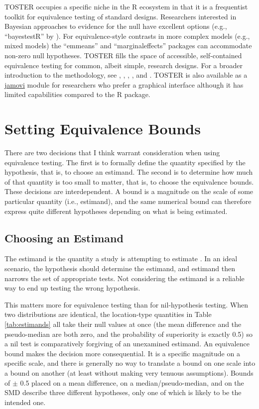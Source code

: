 \documentclass[]{interact}
\theoremstyle{plain}%
\theoremstyle{definition}
\theoremstyle{remark}
\begin{document}
TOSTER occupies a specific niche in the R ecosystem in that it is a
frequentist toolkit for equivalence testing of standard designs.
Researchers interested in Bayesian approaches to evidence for the null
have excellent options (e.g., ``bayestestR'' by \citet{bayestestR}). For
equivalence-style contrasts in more complex models (e.g., mixed models)
the ``emmeans'' \citep{emmeans} and ``marginaleffects''
\citep{marginaleffects} packages can accommodate non-zero null
hypotheses. TOSTER fills the space of accessible, self-contained
equivalence testing for common, albeit simple, research designs. For a
broader introduction to the methodology, see \citet{lakens_ori},
\citet{lakens2018equivalence}, \citet{lakens2020improving},
\citet{mazzolari2022myths}, and \citet{Tomek_Caldwell_Eisner_2026}.
TOSTER is also available as a \href{https://www.jamovi.org/}{jamovi}
module for researchers who prefer a graphical interface although it has
limited capabilities compared to the R package.

\section{Setting Equivalence Bounds}\label{setting-equivalence-bounds}

There are two decisions that I think warrant consideration when using
equivalence testing. The first is to formally define the quantity
specified by the hypothesis, that is, to choose an estimand. The second
is to determine how much of that quantity is too small to matter, that
is, to choose the equivalence bounds. These decisions are
interdependent. A bound is a magnitude on the scale of some particular
quantity (i.e., estimand), and the same numerical bound can therefore
express quite different hypotheses depending on what is being estimated.

\subsection{Choosing an Estimand}\label{choosing-an-estimand}

The estimand is the quantity a study is attempting to estimate
\citep{Lundberg_Johnson_Stewart_2021}. In an ideal scenario, the
hypothesis should determine the estimand, and estimand then narrows the
set of appropriate tests. Not considering the estimand is a reliable way
to end up testing the wrong hypothesis.

This matters more for equivalence testing than for nil-hypothesis
testing. When two distributions are identical, the location-type
quantities in Table \ref{tab:estimands} all take their null values at
once (the mean difference and the pseudo-median are both zero, and the
probability of superiority is exactly 0.5) so a nil test is
comparatively forgiving of an unexamined estimand. An equivalence bound
makes the decision more consequential. It is a specific magnitude on a
specific scale, and there is generally no way to translate a bound on
one scale into a bound on another (at least without making very tenuous
assumptions). Bounds of \(\pm\) 0.5 placed on a mean difference, on a
median/pseudo-median, and on the SMD describe three different
hypotheses, only one of which is likely to be the intended one.
\end{document}
